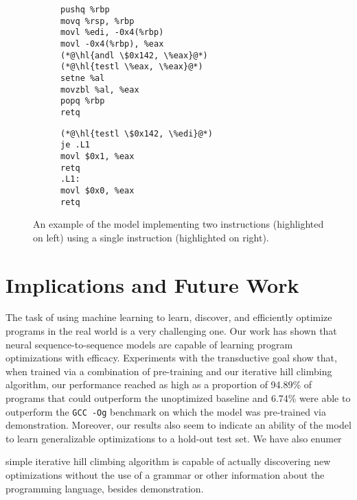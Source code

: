 \documentclass{article}
\begin{document}
\begin{figure}
    \centering
    \begin{subfigure}[t]{\codeboxwidth}
    \begin{lstlisting}
pushq %rbp
movq %rsp, %rbp
movl %edi, -0x4(%rbp)
movl -0x4(%rbp), %eax
(*@\hl{andl \$0x142, \%eax}@*)
(*@\hl{testl \%eax, \%eax}@*)
setne %al
movzbl %al, %eax
popq %rbp
retq
\end{lstlisting}
    \caption{\ozerocodecaption}
    \end{subfigure}
    \hfil
    \begin{subfigure}[t]{\codeboxwidth}
    \begin{lstlisting}
(*@\hl{testl \$0x142, \%edi}@*)
je .L1
movl $0x1, %eax
retq
.L1:
movl $0x0, %eax
retq
\end{lstlisting}
    \caption{\modelcodecaption}
    \end{subfigure}
    \caption{An example of the model implementing two instructions (highlighted on left) using a single instruction (highlighted on right).}
    \label{fig:test_and}
\end{figure}

\section{Implications and Future Work}


The task of using machine learning to learn, discover, and efficiently optimize programs in the real world is a very challenging one. Our work has shown that neural sequence-to-sequence models are capable of learning program optimizations with efficacy. Experiments with the transductive goal show that, when trained via a combination of pre-training and our iterative hill climbing algorithm, our performance reached as high as a proportion of 94.89\% of programs that could outperform the unoptimized baseline and 6.74\% were able to outperform the \texttt{GCC -Og} benchmark on which the model was pre-trained via demonstration. Moreover, our results also seem to indicate an ability of the model to learn generalizable optimizations to a hold-out test set. We have also enumer



simple iterative hill climbing algorithm is capable of actually discovering new optimizations without the use of a grammar or other information about the programming language, besides demonstration. 
\end{document}
